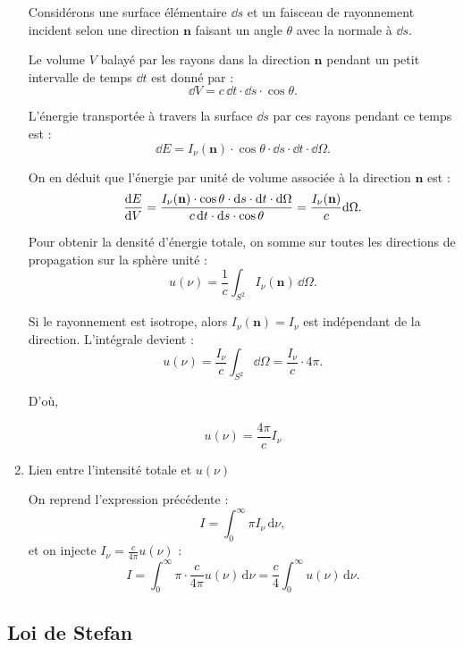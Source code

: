 \documentclass[a4paper,10pt]{report}
\begin{document}
\begin{enumerate}
	
	Considérons une surface élémentaire $\dd s$ et un faisceau de rayonnement incident selon une direction $\textbf{n}$ faisant un angle $\theta$ avec la normale à $\dd s$.
	
	Le volume $V$ balayé par les rayons dans la direction $\textbf{n}$ pendant un petit intervalle de temps $\dd t$ est donné par :
	\[
	\dd V = c\, \dd t \cdot \dd s \cdot \cos\theta.
	\]
	
	L’énergie transportée à travers la surface $\dd s$ par ces rayons pendant ce temps est :
	\[
	\dd E = I_\nu(\textbf{n}) \cdot \cos\theta \cdot \dd s \cdot \dd t \cdot \dd\Omega.
	\]
	
	On en déduit que l’énergie par unité de volume associée à la direction $\textbf{n}$ est :
	\[
	\dv{E}{V} = \frac{I_\nu(\textbf{n}) \cdot \cos\theta \cdot \dd s \cdot \dd t \cdot \dd\Omega}{c\, \dd t \cdot \dd s \cdot \cos\theta}
	= \frac{I_\nu(\textbf{n})}{c} \dd\Omega.
	\]

	
	Pour obtenir la densité d’énergie totale, on somme sur toutes les directions de propagation sur la sphère unité :
	\[
	u(\nu) = \frac{1}{c} \int_{S^2} I_\nu(\textbf{n})\, \dd\Omega.
	\]

	
	Si le rayonnement est isotrope, alors $I_\nu(\textbf{n}) = I_\nu$ est indépendant de la direction. L'intégrale devient :
	\[
	u(\nu) = \frac{I_\nu}{c} \int_{S^2} \dd\Omega = \frac{I_\nu}{c} \cdot 4\pi.
	\]
	
D'où,
	
	\[
	\boxed{u(\nu) = \frac{4\pi}{c} I_\nu}
	\]
	

	\item {Lien entre l’intensité totale et $u(\nu)$}
	
	On reprend l’expression précédente :
	\[
	I = \int_0^\infty \pi I_\nu \, \text{d}\nu,
	\]
	et on injecte $I_\nu = \frac{c}{4\pi} u(\nu)$ :
	\[
	I = \int_0^\infty \pi \cdot \frac{c}{4\pi} u(\nu) \, \text{d}\nu = \frac{c}{4} \int_0^\infty u(\nu) \, \text{d}\nu.
	\]
\end{enumerate}

	
	\subsection{Loi de Stefan}
\end{document}
